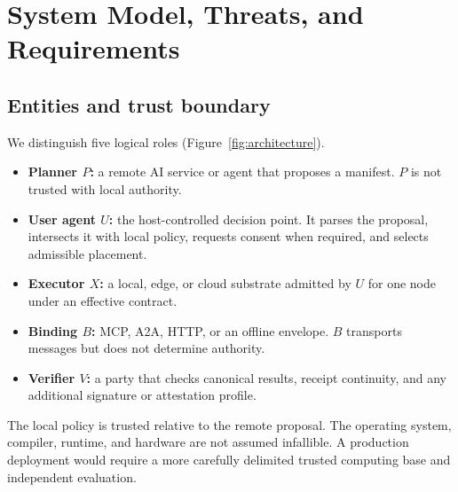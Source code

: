 \section{System Model, Threats, and Requirements}
\label{sec:model}

\subsection{Entities and trust boundary}
We distinguish five logical roles (Figure~\ref{fig:architecture}).
\begin{itemize}
  \item \textbf{Planner $P$:} a remote AI service or agent that proposes a manifest. $P$ is not trusted with local authority.
  \item \textbf{User agent $U$:} the host-controlled decision point. It parses the proposal, intersects it with local policy, requests consent when required, and selects admissible placement.
  \item \textbf{Executor $X$:} a local, edge, or cloud substrate admitted by $U$ for one node under an effective contract.
  \item \textbf{Binding $B$:} MCP, A2A, HTTP, or an offline envelope. $B$ transports messages but does not determine authority.
  \item \textbf{Verifier $V$:} a party that checks canonical results, receipt continuity, and any additional signature or attestation profile.
\end{itemize}

The local policy is trusted relative to the remote proposal. The operating system, compiler, runtime, and hardware are not assumed infallible. A production deployment would require a more carefully delimited trusted computing base and independent evaluation.

